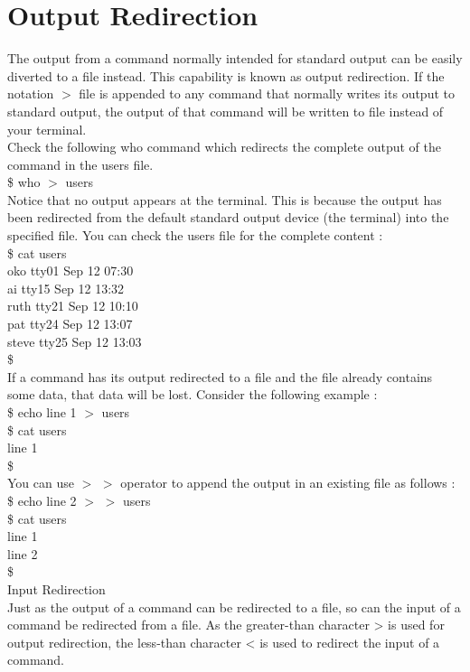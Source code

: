 \documentclass{article}
\begin{document}
\section*{Output Redirection}
The output from a command normally intended for standard output can be easily diverted to a file instead. This capability is known as output redirection.
If the notation $>$ file is appended to any command that normally writes its output to standard output, the output of that command will be written to file instead of your terminal.\\
Check the following who command which redirects the complete output of the command in the users file.\\
\$ who $>$ users\\
Notice that no output appears at the terminal. This is because the output has been redirected from the default standard output device (the terminal) into the specified file. You can check the users file for the complete content :\\
\$ cat users\\
oko         tty01   Sep 12 07:30\\
ai          tty15   Sep 12 13:32\\
ruth        tty21   Sep 12 10:10\\
pat         tty24   Sep 12 13:07\\
steve       tty25   Sep 12 13:03\\
\$\\
If a command has its output redirected to a file and the file already contains some data, that data will be lost. Consider the following example :\\
\$ echo line 1 $>$ users\\
\$ cat users\\
line 1\\
\$\\
You can use $>$ $>$ operator to append the output in an existing file as follows :\\
\$ echo line 2 $>$ $>$ users\\
\$ cat users\\
line 1\\
line 2\\
\$\\
Input Redirection\\
Just as the output of a command can be redirected to a file, so can the input of a command be redirected from a file. As the greater-than character > is used for output redirection, the less-than character < is used to redirect the input of a command.\\
\end{document}
